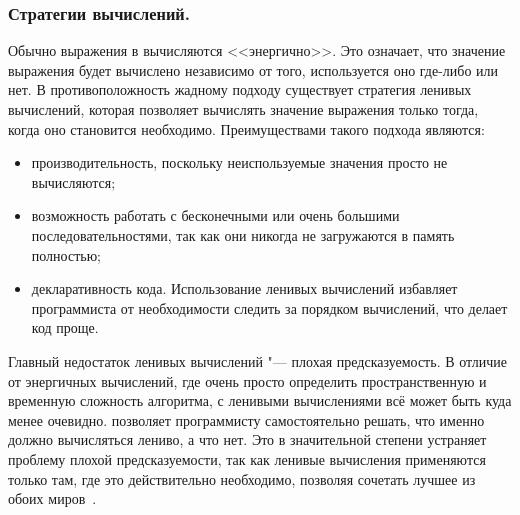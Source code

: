 \subsubsection{Стратегии вычислений. }
\label{ssub:tech:eval_strategy_fsharp}
Обычно выражения в \fsharp{} вычисляются <<энергично>>. 
Это означает, что значение выражения будет вычислено независимо от того, используется оно где-либо или нет.
В противоположность жадному подходу существует стратегия ленивых вычислений, которая
позволяет вычислять значение выражения только тогда, когда оно становится необходимо. 
Преимуществами такого подхода являются:
\begin{itemize}
  \item производительность, поскольку неиспользуемые значения просто не вычисляются;
  \item возможность работать с бесконечными или очень большими последовательностями, так как они никогда не загружаются в память полностью;
  \item декларативность кода. Использование ленивых вычислений избавляет программиста от
необходимости следить за порядком вычислений, что делает код проще.
\end{itemize}

Главный недостаток ленивых вычислений "--- плохая предсказуемость.
В отличие от энергичных вычислений, где очень просто определить пространственную и временную сложность алгоритма, с ленивыми вычислениями всё может быть куда менее очевидно.
\fsharp{} позволяет программисту самостоятельно решать, что именно должно вычисляться лениво, а что нет.
Это в значительной степени устраняет проблему плохой предсказуемости, так как ленивые вычисления применяются только там, где это действительно необходимо, позволяя сочетать лучшее из обоих миров~\cite{fsharp_pfp_issue_5}.


